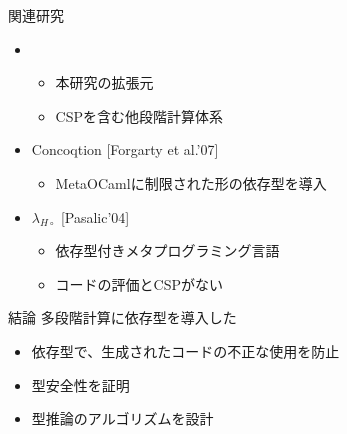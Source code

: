 \documentclass[dvipdfmx,aspectratio=169, 20pt]{beamer}
\begin{document}
\begin{frame}[fragile]{関連研究}
    \begin{itemize}
        \item {}
            \begin{itemize}
                    \item 本研究の拡張元
                    \item CSPを含む他段階計算体系
            \end{itemize}
        \item Concoqtion [Forgarty et al.'07]
            \begin{itemize}
                \item MetaOCamlに制限された形の依存型を導入
            \end{itemize}
        \item \( \lambda_{H\circ} \) [Pasalic'04]
            \begin{itemize}
                \item 依存型付きメタプログラミング言語
                \item コードの評価とCSPがない
            \end{itemize}
    \end{itemize}
\end{frame}

\begin{frame}[fragile]{結論}
    多段階計算に依存型を導入した
    \begin{itemize}
        \item 依存型で、生成されたコードの不正な使用を防止
        \item 型安全性を証明 
        \item 型推論のアルゴリズムを設計 
    \end{itemize}
\end{frame}
\end{document}
